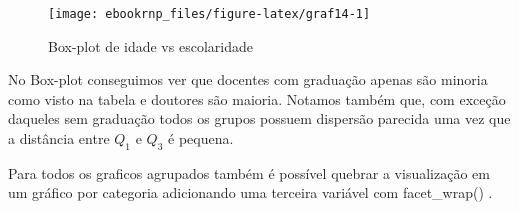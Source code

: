 \documentclass[11pt,]{style/krantz}
\makeatletter
\newenvironment{Shaded}{\begin{snugshade}}{\end{snugshade}}
\newcommand{\DataTypeTok}[1]{\textcolor[rgb]{0.13,0.29,0.53}{#1}}
\newcommand{\KeywordTok}[1]{\textcolor[rgb]{0.13,0.29,0.53}{\textbf{#1}}}
\newcommand{\NormalTok}[1]{#1}
\newcommand{\OperatorTok}[1]{\textcolor[rgb]{0.81,0.36,0.00}{\textbf{#1}}}
\newcommand{\OtherTok}[1]{\textcolor[rgb]{0.56,0.35,0.01}{#1}}
\newcommand{\StringTok}[1]{\textcolor[rgb]{0.31,0.60,0.02}{#1}}
\renewenvironment{quote}{\begin{VF}}{\end{VF}}
\newenvironment{kframe}{%
\medskip{}
\setlength{\fboxsep}{.8em}
 \def\at@end@of@kframe{}%
 \ifinner\ifhmode%
  \def\at@end@of@kframe{\end{minipage}}%
  \begin{minipage}{\columnwidth}%
 \fi\fi%
 \def\FrameCommand##1{\hskip\@totalleftmargin \hskip-\fboxsep
 \colorbox{shadecolor}{##1}\hskip-\fboxsep
     \hskip-\linewidth \hskip-\@totalleftmargin \hskip\columnwidth}%
 \MakeFramed {\advance\hsize-\width
   \@totalleftmargin\z@ \linewidth\hsize
   \@setminipage}}%
 {\par\unskip\endMakeFramed%
 \at@end@of@kframe}
\renewenvironment{Shaded}{\begin{kframe}}{\end{kframe}}
\theoremstyle{definition}
\theoremstyle{definition}
\theoremstyle{definition}
\theoremstyle{remark}
\makeatother
\begin{document}
\begin{Shaded}
\end{Shaded}

\begin{figure}[H]

{\centering \texttt{[image: ebookrnp\_files/figure-latex/graf14-1]} 

}

\caption{Box-plot de idade vs escolaridade}\label{fig:graf14}
\end{figure}

No Box-plot conseguimos ver que docentes com graduação apenas são minoria como visto na tabela e doutores são maioria. Notamos também que, com exceção daqueles sem graduação todos os grupos possuem dispersão parecida uma vez que a distância entre \(Q_1\) e \(Q_3\) é pequena.

\begin{quote}
Para todos os graficos agrupados também é possível quebrar a visualização em um gráfico por categoria adicionando uma terceira variável com facet\_wrap() .
\end{quote}
\end{document}
